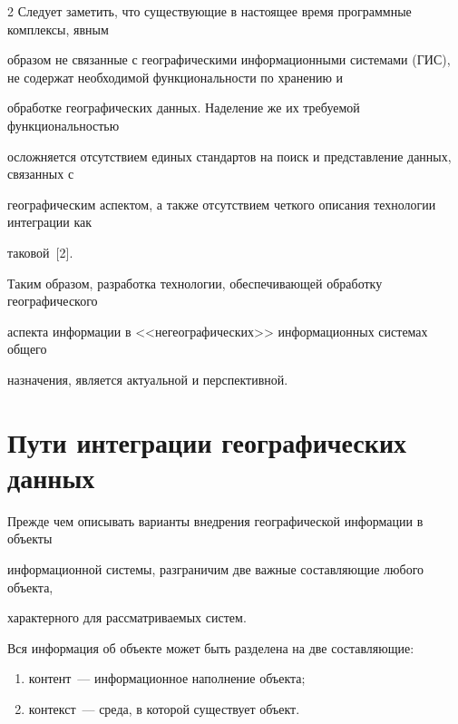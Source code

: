 \begin{multicols}{2}
  Следует заметить, что существующие в настоящее время программные комплексы, явным\linebreak 

образом не связанные с географическими информационными сис\-те\-ма\-ми (ГИС), не содержат необходимой функциональности по хранению и 

обработке географических данных. Наделение же их требуемой функциональностью 

осложняется отсутствием единых стандартов на поиск и представление данных, связанных с 

географическим аспектом, а также отсутствием четкого описания технологии интеграции как 

таковой~[2].

  

  Таким образом, разработка технологии, обеспечивающей обработку географического 

аспекта информации в <<негеографических>> информационных системах общего 

назначения, является актуальной и перспективной.



\vspace*{-6pt}

  

  \section{Пути интеграции географических данных}

  

  \vspace*{-1pt}

  

  Прежде чем описывать варианты внедрения геогра\-фи\-че\-ской информации в объекты 

информационной системы, разграничим две важные со\-став\-ля\-ющие любого объекта, 

характерного для рас\-смат\-ри\-ва\-емых систем.

  

  Вся информация об объекте может быть разделена на две составляющие:

  \begin{enumerate}[(1)]

\item контент~--- информационное наполнение объекта;\\[-14pt]

\item контекст~--- среда, в которой существует объект.


\end{enumerate}
\end{multicols}
